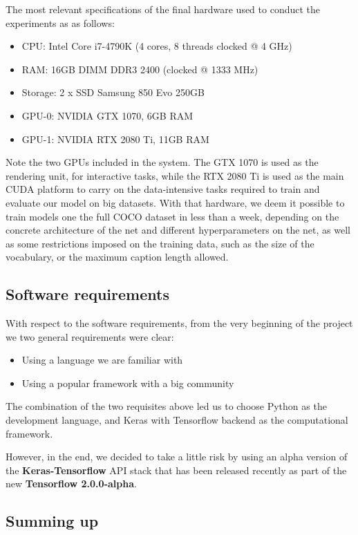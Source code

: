 The most relevant specifications of the final hardware used to conduct the experiments as as follows:

\begin{itemize}
\item CPU: Intel Core i7-4790K (4 cores, 8 threads clocked @ 4 GHz)
\item RAM: 16GB DIMM DDR3 2400 (clocked @ 1333 MHz)
\item Storage: 2 x SSD Samsung 850 Evo 250GB
\item GPU-0: NVIDIA GTX 1070, 6GB RAM
\item GPU-1: NVIDIA RTX 2080 Ti, 11GB RAM
\end{itemize}

Note the two GPUs included in the system. The GTX 1070 is used as the rendering unit, for interactive tasks, while the RTX 2080 Ti is used as the main CUDA platform to carry on the data-intensive tasks required to train and evaluate our model on big datasets. With that hardware, we deem it possible to train models one the full COCO dataset in less than a week, depending on the concrete architecture of the net and different hyperparameters on the net, as well as some restrictions imposed on the training data, such as the size of the vocabulary, or the maximum caption length allowed.

\subsection{Software requirements}

With respect to the software requirements, from the very beginning of the project we  two general requirements were clear:
\begin{itemize}
    \item Using a language we are familiar with
    \item Using a popular framework with a big community 
\end{itemize}

The combination of the two requisites above led us to choose Python as the development language, and Keras with Tensorflow backend as the computational framework. 

However, in the end, we decided to take a little risk by using an alpha version of the \textbf{Keras-Tensorflow} API stack that has been released recently as part of the new \textbf{Tensorflow 2.0.0-alpha}.

\subsection{Summing up}

